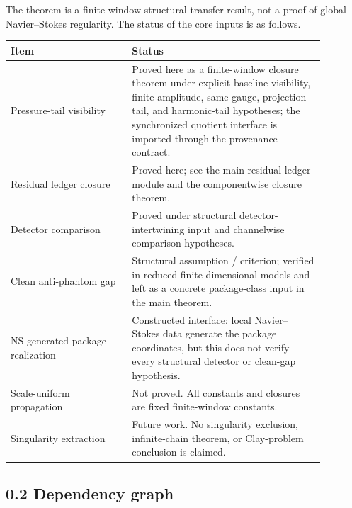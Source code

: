\documentclass[11pt]{article}
\numberwithin{equation}{section}
\theoremstyle{definition}
\theoremstyle{remark}
\begin{document}
The theorem is a finite-window structural transfer result, not a proof of global Navier--Stokes regularity.  The status of the core inputs is as follows.
\begin{center}
\renewcommand{\arraystretch}{1.18}
\begin{tabular}{|p{0.34\linewidth}|p{0.54\linewidth}|}
\hline
\textbf{Item} & \textbf{Status}\\
\hline
Pressure-tail visibility & Proved here as a finite-window closure theorem under explicit baseline-visibility, finite-amplitude, same-gauge, projection-tail, and harmonic-tail hypotheses; the synchronized quotient interface is imported through the provenance contract.\\
\hline
Residual ledger closure & Proved here; see the main residual-ledger module and the componentwise closure theorem.\\
\hline
Detector comparison & Proved under structural detector-intertwining input and channelwise comparison hypotheses.\\
\hline
Clean anti-phantom gap & Structural assumption / criterion; verified in reduced finite-dimensional models and left as a concrete package-class input in the main theorem.\\
\hline
NS-generated package realization & Constructed interface: local Navier--Stokes data generate the package coordinates, but this does not verify every structural detector or clean-gap hypothesis.\\
\hline
Scale-uniform propagation & Not proved.  All constants and closures are fixed finite-window constants.\\
\hline
Singularity extraction & Future work.  No singularity exclusion, infinite-chain theorem, or Clay-problem conclusion is claimed.\\
\hline
\end{tabular}
\end{center}

\subsection*{0.2 Dependency graph}
\end{document}
